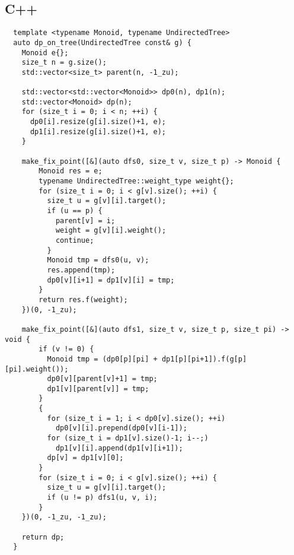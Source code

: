 \documentclass{jsarticle}
\begin{document}
\subsection{C++}
\begin{verbatim}
  template <typename Monoid, typename UndirectedTree>
  auto dp_on_tree(UndirectedTree const& g) {
    Monoid e{};
    size_t n = g.size();
    std::vector<size_t> parent(n, -1_zu);
  
    std::vector<std::vector<Monoid>> dp0(n), dp1(n);
    std::vector<Monoid> dp(n);
    for (size_t i = 0; i < n; ++i) {
      dp0[i].resize(g[i].size()+1, e);
      dp1[i].resize(g[i].size()+1, e);
    }
  
    make_fix_point([&](auto dfs0, size_t v, size_t p) -> Monoid {
        Monoid res = e;
        typename UndirectedTree::weight_type weight{};
        for (size_t i = 0; i < g[v].size(); ++i) {
          size_t u = g[v][i].target();
          if (u == p) {
            parent[v] = i;
            weight = g[v][i].weight();
            continue;
          }
          Monoid tmp = dfs0(u, v);
          res.append(tmp);
          dp0[v][i+1] = dp1[v][i] = tmp;
        }
        return res.f(weight);
    })(0, -1_zu);
  
    make_fix_point([&](auto dfs1, size_t v, size_t p, size_t pi) -> void {
        if (v != 0) {
          Monoid tmp = (dp0[p][pi] + dp1[p][pi+1]).f(g[p][pi].weight());
          dp0[v][parent[v]+1] = tmp;
          dp1[v][parent[v]] = tmp;
        }
        {
          for (size_t i = 1; i < dp0[v].size(); ++i)
            dp0[v][i].prepend(dp0[v][i-1]);
          for (size_t i = dp1[v].size()-1; i--;)
            dp1[v][i].append(dp1[v][i+1]);
          dp[v] = dp1[v][0];
        }
        for (size_t i = 0; i < g[v].size(); ++i) {
          size_t u = g[v][i].target();
          if (u != p) dfs1(u, v, i);
        }
    })(0, -1_zu, -1_zu);
  
    return dp;
  }
\end{verbatim}
\end{document}
